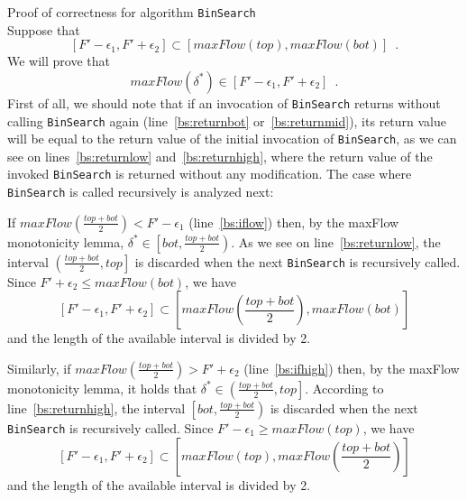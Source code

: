 \begin{sepproof}{Proof of correctness for algorithm \texttt{BinSearch}} \ \\
  Suppose that
  \begin{equation*}
    \left[F' - \epsilon_1, F' + \epsilon_2\right] \subset \left[maxFlow\left(top\right), maxFlow\left(bot\right)\right]
    \enspace.
  \end{equation*}
  We will prove that
  \begin{equation*}
    maxFlow\left(\delta^*\right) \in \left[F' - \epsilon_1, F' + \epsilon_2\right] \enspace.
  \end{equation*}
  First of all, we should note that if an invocation of \texttt{BinSearch} returns without calling \texttt{BinSearch} again
  (line~\ref{bs:returnbot} or~\ref{bs:returnmid}), its return value will be equal to the return value of the initial
  invocation of \texttt{BinSearch}, as we can see on lines~\ref{bs:returnlow} and~\ref{bs:returnhigh}, where the return
  value of the invoked \texttt{BinSearch} is returned without any modification. The case where \texttt{BinSearch} is called
  recursively is analyzed next:

  If $maxFlow\left(\frac{top+bot}{2}\right) < F' - \epsilon_1$ (line~\ref{bs:iflow}) then, by the maxFlow monotonicity
  lemma, $\delta^* \in \left[bot,\frac{top+bot}{2}\right)$. As we see on line~\ref{bs:returnlow}, the interval
  $\left(\frac{top+bot}{2}, top\right]$ is discarded when the next \texttt{BinSearch} is recursively called. Since
  $F' + \epsilon_2 \leq maxFlow\left(bot\right)$, we have
  \begin{equation*}
    \left[F' - \epsilon_1, F' + \epsilon_2\right] \subset \left[maxFlow\left(\frac{top+bot}{2}\right),
    maxFlow\left(bot\right)\right]
  \end{equation*}
  and the length of the available interval is divided by 2.

  Similarly, if $maxFlow\left(\frac{top+bot}{2}\right) > F' + \epsilon_2$ (line~\ref{bs:ifhigh}) then, by the maxFlow
  monotonicity lemma, it holds that $\delta^* \in \left(\frac{top+bot}{2}, top\right]$. According to
  line~\ref{bs:returnhigh}, the interval $\left[bot, \frac{top+bot}{2}\right)$ is discarded when the next
  \texttt{BinSearch} is recursively called. Since $F'- \epsilon_1 \geq maxFlow\left(top\right)$, we have
  \begin{equation*}
    \left[F' - \epsilon_1, F' + \epsilon_2\right] \subset \left[maxFlow\left(top\right),
    maxFlow\left(\frac{top+bot}{2}\right)\right]
  \end{equation*}
  and the length of the available interval is divided by 2.


\end{sepproof}
